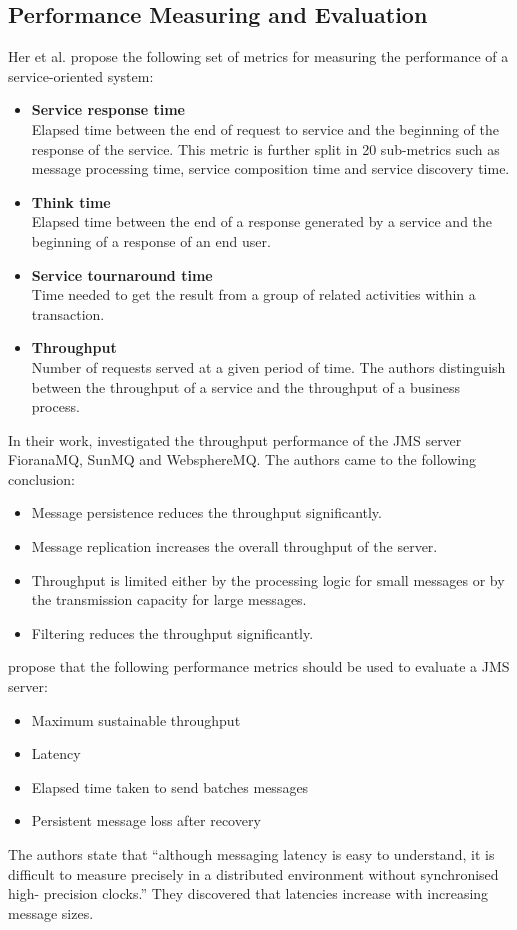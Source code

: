\subsection{Performance Measuring and Evaluation}
Her et al. \citep{Her:2007qf} propose the following set of metrics for measuring the performance of a service-oriented system:
\begin{itemize}
	\item \textbf{Service response time}\\
	Elapsed time between the end of request to service and the beginning of the response of the service. This metric is further split in 20 sub-metrics such as message processing time, service composition time and service discovery time.
	\item \textbf{Think time}\\
	Elapsed time between the end of a response generated by a service and the beginning of a response of an end user.
	\item \textbf{Service tournaround time}\\
	Time needed to get the result from a group of related activities within a transaction.
	\item \textbf{Throughput}\\
	Number of requests served at a given period of time. The authors distinguish between the throughput of a service and the throughput of a business process.
\end{itemize}

In their work, \cite{Henjes:2006nx}\cite{Menth:2006ys} investigated the throughput performance of the JMS server FioranaMQ, SunMQ and WebsphereMQ. The authors came to the following conclusion:
\begin{itemize}
	\item Message persistence reduces the throughput significantly.
	\item Message replication increases the overall throughput of the server.
	\item Throughput is limited either by the processing logic for small messages or by the transmission capacity for large messages.
	\item Filtering reduces the throughput significantly.
\end{itemize}

\cite{Chen:2004cr} propose that the following performance metrics should be used to evaluate a JMS server:
\begin{itemize}
	\item Maximum sustainable throughput
	\item Latency
	\item Elapsed time taken to send batches messages
	\item Persistent message loss after recovery
\end{itemize}
The authors state that ``although messaging latency is easy to understand, it is difficult to measure precisely in a distributed environment without synchronised high- precision clocks.'' They discovered that latencies increase with increasing message sizes.

